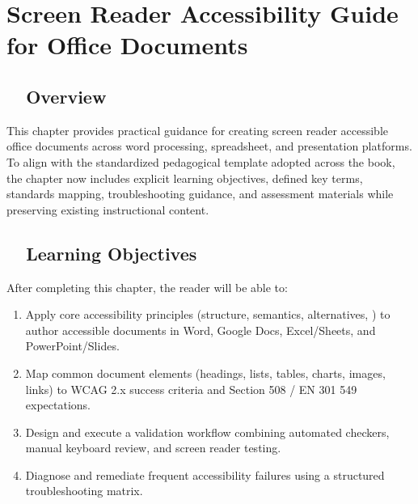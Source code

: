 \chapter{Screen Reader Accessibility Guide for Office Documents}\label{ch15:office-\gidx{accessibility}{accessibility}}

\section{~~Overview}\label{ch15:sec:overview}
This chapter provides practical guidance for creating screen reader accessible office documents across word processing, spreadsheet, and presentation platforms. To align with the standardized pedagogical template adopted across the book, the chapter now includes explicit learning objectives, defined key terms, standards mapping, troubleshooting guidance, and assessment materials while preserving existing instructional content.

\section{~~Learning Objectives}\label{ch15:sec:learning-objectives}
After completing this chapter, the reader will be able to:
\begin{enumerate}
	\item Apply core accessibility principles (structure, semantics, alternatives, ) to author accessible documents in Word, Google Docs, Excel/Sheets, and PowerPoint/Slides.
	\item Map common document elements (headings, lists, tables, charts, images, links) to WCAG 2.x success criteria and Section 508 / EN 301 549 expectations.
	\item Design and execute a validation workflow combining automated checkers, manual keyboard review, and screen reader testing.
	\item Diagnose and remediate frequent accessibility failures using a structured troubleshooting matrix.
\end{enumerate}


